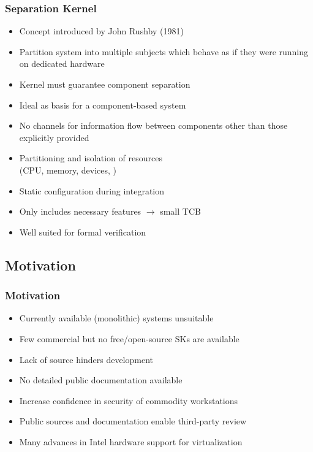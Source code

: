 \documentclass[xcolor={dvipsnames}]{beamer}
\begin{document}
\begin{frame}\frametitle{Separation Kernel}
\begin{itemize}
	\item Concept introduced by John Rushby (1981)
	\item Partition system into multiple subjects which behave as if they were running on dedicated hardware
	\item Kernel must guarantee component separation
	\item Ideal as basis for a component-based system
	\item No channels for information flow between components other than those explicitly provided
	\item Partitioning and isolation of resources\\(CPU, memory, devices, \textellipsis)
	\item Static configuration during integration
	\item Only includes necessary features $\rightarrow$ small TCB
	\item Well suited for formal verification
\end{itemize}
\end{frame}

\subsection{Motivation}
\begin{frame}\frametitle{Motivation}
\begin{itemize}
	\item Currently available (monolithic) systems unsuitable
	\item Few commercial but no free/open-source SKs are available
	\item Lack of source hinders development
	\item No detailed public documentation available
	\item Increase confidence in security of commodity workstations
	\item Public sources and documentation enable third-party review
	\item Many advances in Intel hardware support for virtualization
\end{itemize}
\end{frame}
\end{document}
